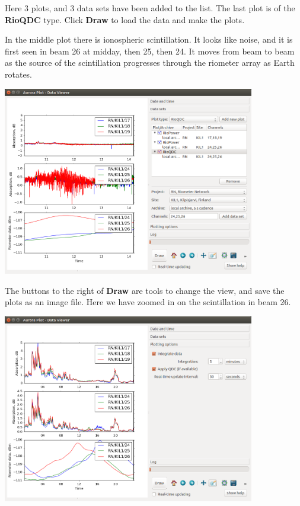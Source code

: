 \documentclass{article}
\begin{document}
Here 3 plots, and 3 data sets have been added to the list. The last plot is of the {\bf RioQDC} type. Click {\bf Draw} to load the data and make the plots.

In the middle plot there is ionospheric scintillation. It looks like noise, and it is first seen in beam 26 at midday, then 25, then 24. 
It moves from beam to beam as the source of the scintillation progresses through the riometer array as Earth rotates.

\begin{center}
\includegraphics[width=11cm]{images/dv-4.png}
\end{center}

The buttons to the right of {\bf Draw} are tools to change the view, and save the plots as an image file. Here we have zoomed in on the scintillation in beam 26.

\begin{center}
\includegraphics[width=11cm]{images/dv-5.png}
\end{center}
\end{document}
